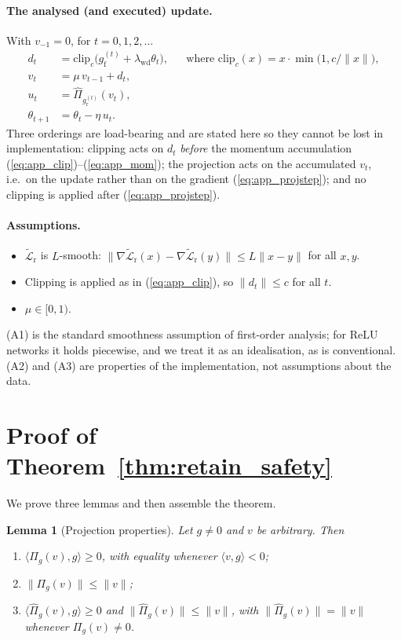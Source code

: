 \documentclass{article}
\newcommand{\gf}{g_{\mathrm{f}}}
\newcommand{\gr}{g_{\mathrm{r}}}
\newcommand{\Lrt}{\widetilde{\mathcal{L}}_{\mathrm{r}}}
\newtheorem{lemma}{Lemma}
\theoremstyle{remark}
\theoremstyle{plain}
\begin{document}
\paragraph{The analysed (and executed) update.}
With $v_{-1}=0$, for $t = 0,1,2,\dots$
\begin{align}
d_t &= \mathrm{clip}_c\!\big(\gf^{(t)} + \lambda_{\mathrm{wd}}\theta_t\big),
      &&\text{where } \mathrm{clip}_c(x) = x\cdot\min\!\big(1, c/\|x\|\big),
      \label{eq:app_clip}\\
v_t &= \mu\,v_{t-1} + d_t, \label{eq:app_mom}\\
u_t &= \widehat{\Pi}_{\gr^{(t)}}(v_t), \label{eq:app_projstep}\\
\theta_{t+1} &= \theta_t - \eta\,u_t. \label{eq:app_step}
\end{align}
Three orderings are load-bearing and are stated here so they cannot be lost in
implementation: clipping acts on $d_t$ \emph{before} the momentum accumulation
(\ref{eq:app_clip})--(\ref{eq:app_mom}); the projection acts on the accumulated
$v_t$, i.e.\ on the update rather than on the gradient (\ref{eq:app_projstep});
and no clipping is applied after (\ref{eq:app_projstep}).

\paragraph{Assumptions.}
\begin{itemize}
\item[(A1)] $\Lrt$ is $L$-smooth: $\|\nabla\Lrt(x)-\nabla\Lrt(y)\| \le L\|x-y\|$
for all $x,y$.
\item[(A2)] Clipping is applied as in (\ref{eq:app_clip}), so $\|d_t\| \le c$ for
all $t$.
\item[(A3)] $\mu \in [0,1)$.
\end{itemize}
(A1) is the standard smoothness assumption of first-order analysis; for ReLU
networks it holds piecewise, and we treat it as an idealisation, as is
conventional. (A2) and (A3) are properties of the implementation, not
assumptions about the data.

\section{Proof of Theorem~\ref{thm:retain_safety}}\label{app:thm1}

We prove three lemmas and then assemble the theorem.

\begin{lemma}[Projection properties]\label{lem:proj}
Let $g \ne 0$ and $v$ be arbitrary. Then
\begin{enumerate}
\item[(i)] $\langle \Pi_g(v), g\rangle \ge 0$, with equality whenever
$\langle v,g\rangle < 0$;
\item[(ii)] $\|\Pi_g(v)\| \le \|v\|$;
\item[(iii)] $\langle \widehat{\Pi}_g(v), g\rangle \ge 0$ and
$\|\widehat{\Pi}_g(v)\| \le \|v\|$, with $\|\widehat{\Pi}_g(v)\| = \|v\|$
whenever $\Pi_g(v)\ne 0$.
\end{enumerate}
\end{lemma}
\end{document}
